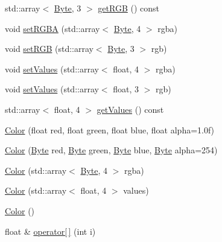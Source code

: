 \begin{DoxyCompactItemize}
\item 
std\+::array$<$ \hyperlink{namespacemc_a64bc4fa1f43bc4da5c7ac98c04c863e8}{Byte}, 3 $>$ \hyperlink{classmc_1_1_color_ae39cadb4578c3bb69b19448d66dd5407}{get\+R\+GB} () const 
\item 
void \hyperlink{classmc_1_1_color_ac23627f6b91a7ce949adebcd27c1df5c}{set\+R\+G\+BA} (std\+::array$<$ \hyperlink{namespacemc_a64bc4fa1f43bc4da5c7ac98c04c863e8}{Byte}, 4 $>$ rgba)
\item 
void \hyperlink{classmc_1_1_color_aedc41be210068d6f866946c4d7d879a6}{set\+R\+GB} (std\+::array$<$ \hyperlink{namespacemc_a64bc4fa1f43bc4da5c7ac98c04c863e8}{Byte}, 3 $>$ rgb)
\item 
void \hyperlink{classmc_1_1_color_ae5b6e1cb3b203ced2ccff4ed944c356f}{set\+Values} (std\+::array$<$ float, 4 $>$ rgba)
\item 
void \hyperlink{classmc_1_1_color_af499d9082bc56e0adc56d119b7239645}{set\+Values} (std\+::array$<$ float, 3 $>$ rgb)
\item 
std\+::array$<$ float, 4 $>$ \hyperlink{classmc_1_1_color_a8c8658aae5411b6a1003f6021b97c2da}{get\+Values} () const 
\item 
\hyperlink{classmc_1_1_color_a80052b11d19f84f421a3fcb93826af6e}{Color} (float red, float green, float blue, float alpha=1.\+0f)
\item 
\hyperlink{classmc_1_1_color_a49da9f32b70d62c34a2ea380d5dc3eae}{Color} (\hyperlink{namespacemc_a64bc4fa1f43bc4da5c7ac98c04c863e8}{Byte} red, \hyperlink{namespacemc_a64bc4fa1f43bc4da5c7ac98c04c863e8}{Byte} green, \hyperlink{namespacemc_a64bc4fa1f43bc4da5c7ac98c04c863e8}{Byte} blue, \hyperlink{namespacemc_a64bc4fa1f43bc4da5c7ac98c04c863e8}{Byte} alpha=254)
\item 
\hyperlink{classmc_1_1_color_a436ad96689f1ca1da36291c632bf60f6}{Color} (std\+::array$<$ \hyperlink{namespacemc_a64bc4fa1f43bc4da5c7ac98c04c863e8}{Byte}, 4 $>$ rgba)
\item 
\hyperlink{classmc_1_1_color_a8517c04d0d219ba58d38dd78275a768c}{Color} (std\+::array$<$ float, 4 $>$ values)
\item 
\hyperlink{classmc_1_1_color_ac4d3de0b00fb4965ff453bea21bd5f97}{Color} ()
\item 
float \& \hyperlink{classmc_1_1_color_ad58f03a3459404cf9e58e50baaec8f90}{operator\mbox{[}$\,$\mbox{]}} (int i)
\end{DoxyCompactItemize}
